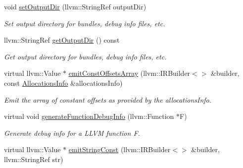 \begin{DoxyCompactItemize}
void \hyperlink{classglow_1_1_l_l_v_m_i_r_gen_af9be8ef572613c2d6d0acbc30a41439e}{set\+Output\+Dir} (llvm\+::\+String\+Ref output\+Dir)
\begin{DoxyCompactList}\small\item\em Set output directory for bundles, debug info files, etc. \end{DoxyCompactList}\item 
\mbox{\label{classglow_1_1_l_l_v_m_i_r_gen_a81843ca4f785f138b7d88b35a9e7df61}} 
llvm\+::\+String\+Ref \hyperlink{classglow_1_1_l_l_v_m_i_r_gen_a81843ca4f785f138b7d88b35a9e7df61}{get\+Output\+Dir} () const
\begin{DoxyCompactList}\small\item\em Get output directory for bundles, debug info files, etc. \end{DoxyCompactList}\item 
\mbox{\label{classglow_1_1_l_l_v_m_i_r_gen_ae99d4cedbf1aedd16201a3f0c00af3a6}} 
virtual llvm\+::\+Value $\ast$ \hyperlink{classglow_1_1_l_l_v_m_i_r_gen_ae99d4cedbf1aedd16201a3f0c00af3a6}{emit\+Const\+Offsets\+Array} (llvm\+::\+I\+R\+Builder$<$$>$ \&builder, const \hyperlink{structglow_1_1_allocations_info}{Allocations\+Info} \&allocations\+Info)
\begin{DoxyCompactList}\small\item\em Emit the array of constant offsets as provided by the {\ttfamily allocations\+Info}. \end{DoxyCompactList}\item 
\mbox{\label{classglow_1_1_l_l_v_m_i_r_gen_a0b59669dd5d26b9f937b3f57727d7f62}} 
virtual void \hyperlink{classglow_1_1_l_l_v_m_i_r_gen_a0b59669dd5d26b9f937b3f57727d7f62}{generate\+Function\+Debug\+Info} (llvm\+::\+Function $\ast$F)
\begin{DoxyCompactList}\small\item\em Generate debug info for a L\+L\+VM function {\ttfamily F}. \end{DoxyCompactList}\item 
\mbox{\label{classglow_1_1_l_l_v_m_i_r_gen_a3fb32e0e9805be98150fab0a83b61940}} 
virtual llvm\+::\+Value $\ast$ \hyperlink{classglow_1_1_l_l_v_m_i_r_gen_a3fb32e0e9805be98150fab0a83b61940}{emit\+String\+Const} (llvm\+::\+I\+R\+Builder$<$$>$ \&builder, llvm\+::\+String\+Ref str)

\end{DoxyCompactItemize}
